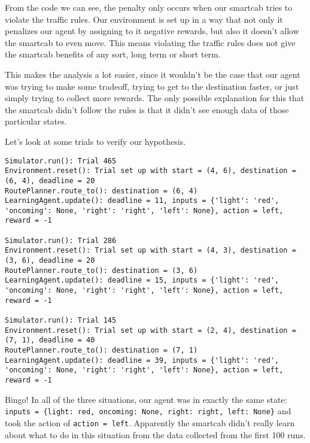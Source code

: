 \documentclass{article}
\begin{document}
From the code we can see, the penalty only occurs when our smartcab
tries to violate the traffic rules. Our environment is set up in a way
that not only it penalizes our agent by assigning to it negative
rewards, but also it doesn't allow the smartcab to even move. This means
violating the traffic rules does not give the smartcab benefits of any
sort, long term or short term.

This makes the analysis a lot easier, since it wouldn't be the case that
our agent was trying to make some tradeoff, trying to get to the
destination faster, or just simply trying to collect more rewards. The
only possible explanation for this that the smartcab didn't follow the
rules is that it didn't see enough data of those particular states.

Let's look at some trials to verify our hypothesis.

\begin{verbatim}
Simulator.run(): Trial 465
Environment.reset(): Trial set up with start = (4, 6), destination = (6, 4), deadline = 20
RoutePlanner.route_to(): destination = (6, 4)
LearningAgent.update(): deadline = 11, inputs = {'light': 'red', 'oncoming': None, 'right': 'right', 'left': None}, action = left, reward = -1

Simulator.run(): Trial 286
Environment.reset(): Trial set up with start = (4, 3), destination = (3, 6), deadline = 20
RoutePlanner.route_to(): destination = (3, 6)
LearningAgent.update(): deadline = 15, inputs = {'light': 'red', 'oncoming': None, 'right': 'right', 'left': None}, action = left, reward = -1

Simulator.run(): Trial 145
Environment.reset(): Trial set up with start = (2, 4), destination = (7, 1), deadline = 40
RoutePlanner.route_to(): destination = (7, 1)
LearningAgent.update(): deadline = 39, inputs = {'light': 'red', 'oncoming': None, 'right': 'right', 'left': None}, action = left, reward = -1
\end{verbatim}

Bingo! In all of the three situations, our agent was in exactly the same
state:
\texttt{inputs\ =\ \{\textquotesingle{}light\textquotesingle{}:\ \textquotesingle{}red\textquotesingle{},\ \textquotesingle{}oncoming\textquotesingle{}:\ None,\ \textquotesingle{}right\textquotesingle{}:\ \textquotesingle{}right\textquotesingle{},\ \textquotesingle{}left\textquotesingle{}:\ None\}}
and took the action of \texttt{action\ =\ left}. Apparently the smartcab
didn't really learn about what to do in this situation from the data
collected from the first 100 runs.
\end{document}
